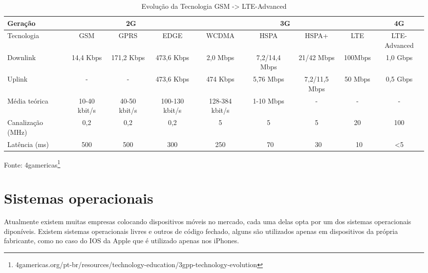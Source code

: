 \begin{table}[!htb]
	\tiny
  	\centering
	\label{tab:LTE}
	\begin{tabular}{|l|*{8}{c|}}
		\hline \SPACE
		Geração & \multicolumn{3}{|c|}{2G}  & \multicolumn{4}{|c|}{3G}  & 4G\\ \hline \SPACE
		Tecnologia & GSM & GPRS & EDGE & WCDMA & HSPA & HSPA+ & LTE & LTE-Advanced\\ \hline \SPACE
		Downlink & 14,4 Kbps & 171,2 Kbps & 473,6 Kbps & 2,0 Mbps & 7,2/14,4 Mbps & 21/42 Mbps & 100Mbps & 1,0 Gbps\\ \hline \SPACE
		Uplink & - & - & 473,6 Kbps & 474 Kbps & 5,76 Mbps & 7,2/11,5 Mbps & 50 Mbps & 0,5 Gbps\\ \hline \SPACE
		Média teórica & 10-40 kbit/s & 40-50 kbit/s & 100-130 kbit/s & 128-384 kbit/s & 1-10 Mbps & - & - & -\\ \hline \SPACE
		Canalização (MHz) & 0,2 & 0,2 & 0,2 & 5 & 5 & 5 & 20 & 100\\ \hline \SPACE
		Latência (ms) & 500 & 500 & 300 & 250 & ~70 & ~30 & ~10 & <5\\ \hline
	\end{tabular}
	\caption[Evolução da Tecnologia GSM -> LTE-Advanced]{Evolução da Tecnologia GSM -> LTE-Advanced}
\end{table}\vspace{3.3cm}
\begin{center}
\small{Fonte: 4gamericas\footnote{4gamericas.org/pt-br/resources/technology-education/3gpp-technology-evolution}}
\end{center}

\section{Sistemas operacionais}
Atualmente existem muitas empresas colocando dispositivos móveis no mercado, cada uma delas opta por um dos sistemas operacionais diponíveis.
Existem sistemas operacionais livres e outros de código fechado, alguns são utilizados apenas em dispositivos da própria fabricante, como no caso do IOS da Apple que é utilizado apenas nos iPhones.

